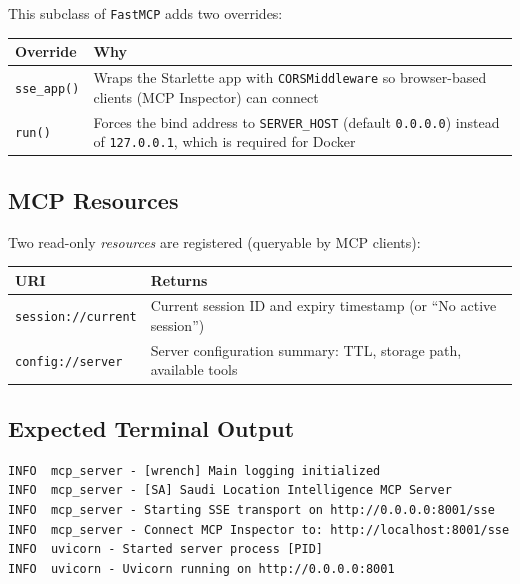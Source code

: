 \documentclass[12pt,a4paper]{report}
\begin{document}
This subclass of \texttt{FastMCP} adds two overrides:

\begin{center}
\begin{tabularx}{\linewidth}{lX}
  \toprule
  \textbf{Override} & \textbf{Why} \\
  \midrule
  \texttt{sse\_app()} & Wraps the Starlette app with \texttt{CORSMiddleware} so browser-based clients (MCP Inspector) can connect \\
  \texttt{run()} & Forces the bind address to \texttt{SERVER\_HOST} (default \texttt{0.0.0.0}) instead of \texttt{127.0.0.1}, which is required for Docker \\
  \bottomrule
\end{tabularx}
\end{center}

\subsection{MCP Resources}

Two read-only \emph{resources} are registered (queryable by MCP clients):

\begin{center}
\begin{tabularx}{\linewidth}{lX}
  \toprule
  \textbf{URI} & \textbf{Returns} \\
  \midrule
  \texttt{session://current} & Current session ID and expiry timestamp (or ``No active session'') \\
  \texttt{config://server} & Server configuration summary: TTL, storage path, available tools \\
  \bottomrule
\end{tabularx}
\end{center}

\subsection{Expected Terminal Output}

\begin{lstlisting}[language={},caption={Terminal output on startup}]
INFO  mcp_server - [wrench] Main logging initialized
INFO  mcp_server - [SA] Saudi Location Intelligence MCP Server
INFO  mcp_server - Starting SSE transport on http://0.0.0.0:8001/sse
INFO  mcp_server - Connect MCP Inspector to: http://localhost:8001/sse
INFO  uvicorn - Started server process [PID]
INFO  uvicorn - Uvicorn running on http://0.0.0.0:8001
\end{lstlisting}
\end{document}
